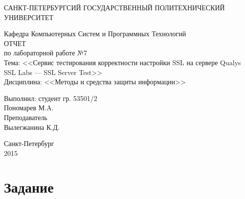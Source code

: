 \documentclass[utf8x, 12pt]{G7-32}
\begin{document}
\frontmatter 


\begin{center} 

\large САНКТ-ПЕТЕРБУРГСИЙ ГОСУДАРСТВЕННЫЙ ПОЛИТЕХНИЧЕСКИЙ УНИВЕРСИТЕТ

\large Кафедра Компьютерных Систем и Программных Технологий \\[5.5cm] 

\huge ОТЧЕТ \\[0.6cm] %
\large по лабораторной работе №7\\
\large Тема: <<Сервис тестирования корректности настройки SSL на сервере Qualys SSL Labs --- SSL Server Test>>\\
\large Дисциплина: <<Методы и средства защиты информации>>\\[3.7cm]

\end{center} 

\begin{flushright}
Выполнил: студент гр. 53501/2 \\
Пономарев М.A. \\[1.2cm]


Преподаватель \\
Вылегжанина К.Д.
\end{flushright}


\vfill 

\begin{center} 
\large Санкт-Петербург \\
2015
\end{center} 

\thispagestyle{empty}



\thispagestyle{empty}
\setcounter{page}{0}
\tableofcontents
\clearpage
\mainmatter


\chapter{Задание}
\end{document}
